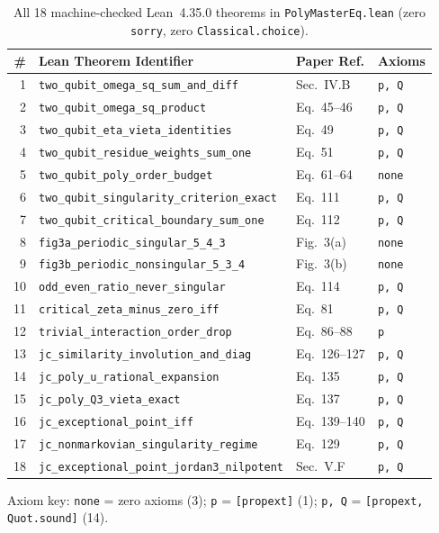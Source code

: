 \documentclass[10pt,twocolumn]{article}
\begin{document}
\begin{table}[t]
\centering
\caption{All 18 machine-checked Lean~4.35.0 theorems in \texttt{PolyMasterEq.lean} (zero \texttt{sorry}, zero \texttt{Classical.choice}).}
\label{tab:lean}
\scriptsize
\setlength{\tabcolsep}{3.0pt}
\begin{tabular}{@{}rlll@{}}
\toprule
\# & Lean Theorem Identifier & Paper Ref. & Axioms \\
\midrule
1 & \texttt{two\_qubit\_omega\_sq\_sum\_and\_diff} & Sec.~IV.B & \texttt{p, Q} \\
2 & \texttt{two\_qubit\_omega\_sq\_product} & Eq.~45--46 & \texttt{p, Q} \\
3 & \texttt{two\_qubit\_eta\_vieta\_identities} & Eq.~49 & \texttt{p, Q} \\
4 & \texttt{two\_qubit\_residue\_weights\_sum\_one} & Eq.~51 & \texttt{p, Q} \\
5 & \texttt{two\_qubit\_poly\_order\_budget} & Eq.~61--64 & \texttt{none} \\
6 & \texttt{two\_qubit\_singularity\_criterion\_exact} & Eq.~111 & \texttt{p, Q} \\
7 & \texttt{two\_qubit\_critical\_boundary\_sum\_one} & Eq.~112 & \texttt{p, Q} \\
8 & \texttt{fig3a\_periodic\_singular\_5\_4\_3} & Fig.~3(a) & \texttt{none} \\
9 & \texttt{fig3b\_periodic\_nonsingular\_5\_3\_4} & Fig.~3(b) & \texttt{none} \\
10 & \texttt{odd\_even\_ratio\_never\_singular} & Eq.~114 & \texttt{p, Q} \\
11 & \texttt{critical\_zeta\_minus\_zero\_iff} & Eq.~81 & \texttt{p, Q} \\
12 & \texttt{trivial\_interaction\_order\_drop} & Eq.~86--88 & \texttt{p} \\
13 & \texttt{jc\_similarity\_involution\_and\_diag} & Eq.~126--127 & \texttt{p, Q} \\
14 & \texttt{jc\_poly\_u\_rational\_expansion} & Eq.~135 & \texttt{p, Q} \\
15 & \texttt{jc\_poly\_Q3\_vieta\_exact} & Eq.~137 & \texttt{p, Q} \\
16 & \texttt{jc\_exceptional\_point\_iff} & Eq.~139--140 & \texttt{p, Q} \\
17 & \texttt{jc\_nonmarkovian\_singularity\_regime} & Eq.~129 & \texttt{p, Q} \\
18 & \texttt{jc\_exceptional\_point\_jordan3\_nilpotent} & Sec.~V.F & \texttt{p, Q} \\
\bottomrule
\end{tabular}
\vspace{-0.4em}
\begin{flushleft}
\tiny Axiom key: \texttt{none} = zero axioms (3); \texttt{p} = \texttt{[propext]} (1); \texttt{p, Q} = \texttt{[propext, Quot.sound]} (14).
\end{flushleft}
\vspace{-0.8em}
\end{table}
\end{document}
